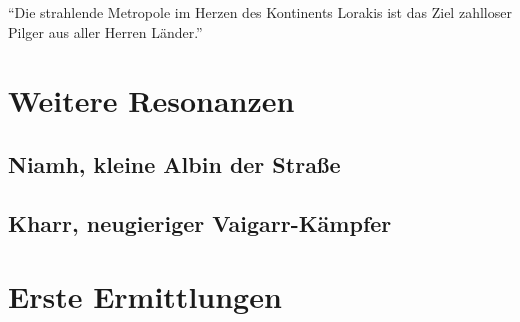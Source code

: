 \begin{center}
	\enquote{Die strahlende Metropole im Herzen des Kontinents Lorakis ist das Ziel zahlloser Pilger aus aller Herren Länder.}
\end{center}

\section{Weitere Resonanzen}
\subsection{Niamh, kleine Albin der Straße}
\subsection{Kharr, neugieriger Vaigarr-Kämpfer}

\section{Erste Ermittlungen}
